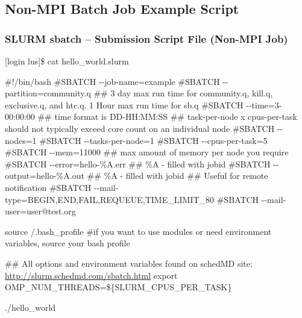 \documentclass[t,hyperref={pdfpagelabels=false}]{beamer}
\newcommand{\ctilde}{{\fontfamily{ptm}\selectfont\texttildelow}}
\newcommand{\ddash}{-{}-}
\begin{document}
\subsection{Non-MPI Batch Job Example Script}
\begin{frame}[fragile]
\frametitle{SLURM sbatch -- Submission Script File (Non-MPI Job)}
\begin{semiverbatim}\tiny
[login lus]\$ cat hello_world.slurm

\#!/bin/bash
\#SBATCH \ddash{}job-name=example
\#SBATCH \ddash{}partition=community.q
\#\# 3 day max run time for community.q, kill.q, exclusive.q, and htc.q.  1 Hour max run time for sb.q
\#SBATCH \ddash{}time=3-00:00:00 ## time format is DD-HH:MM:SS
\#\# task-per-node x cpus-per-task should not typically exceed core count on an individual node 
\#SBATCH \ddash{}nodes=1
\#SBATCH \ddash{}tasks-per-node=1
\#SBATCH \ddash{}cpus-per-task=5
\#SBATCH \ddash{}mem=11000 \#\# max amount of memory per node you require
\#SBATCH \ddash{}error=hello-\%A.err \#\# \%A - filled with jobid
\#SBATCH \ddash{}output=hello-\%A.out \#\# \%A - filled with jobid
\#\# Useful for remote notification
\#SBATCH \ddash{}mail-type=BEGIN,END,FAIL,REQUEUE,TIME\_LIMIT\_80
\#SBATCH \ddash{}mail-user=user@test.org

source \ctilde/.bash_profile \#if you want to use modules or need environment variables, source your bash profile

\#\# All options and environment variables found on schedMD site: \href{http://slurm.schedmd.com/sbatch.html}{http://slurm.schedmd.com/sbatch.html}
export OMP\_NUM\_THREADS=\$\{SLURM\_CPUS\_PER\_TASK\}

./hello\_world
\end{semiverbatim}
\end{frame}
\end{document}
